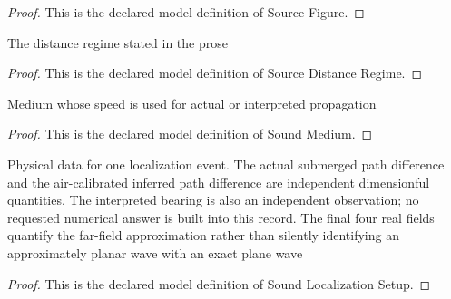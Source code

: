 \begin{proof}
  This is the declared model definition of Source Figure.
\end{proof}
\begin{definition}
  \label{def:physics:phyx-mini-0308:phyxminiproblems-problemphyxmini0308-sourcedistanceregime}
  The distance regime stated in the prose
\end{definition}
\begin{proof}
  This is the declared model definition of Source Distance Regime.
\end{proof}
\begin{definition}
  \label{def:physics:phyx-mini-0308:phyxminiproblems-problemphyxmini0308-soundmedium}
  Medium whose speed is used for actual or interpreted propagation
\end{definition}
\begin{proof}
  This is the declared model definition of Sound Medium.
\end{proof}
\begin{definition}
  \label{def:physics:phyx-mini-0308:phyxminiproblems-problemphyxmini0308-soundlocalizationsetup}
  Physical data for one localization event. The actual submerged path difference and the air-calibrated inferred path difference are independent dimensionful quantities. The interpreted bearing is also an independent observation; no requested numerical answer is built into this record. The final four real fields quantify the far-field approximation rather than silently identifying an approximately planar wave with an exact plane wave
\end{definition}
\begin{proof}
  This is the declared model definition of Sound Localization Setup.
\end{proof}
